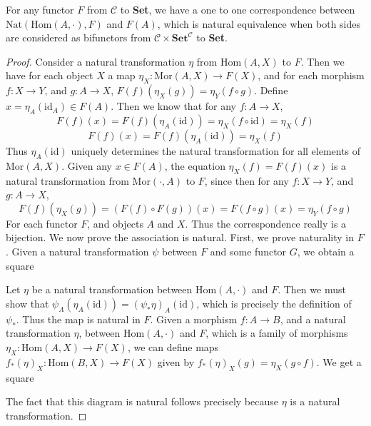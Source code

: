 \begin{theorem}[Yoneda]
    For any functor $F$ from $\mathcal{C}$ to {\bf Set}, we have a one to one correspondence between $\text{Nat}(\text{Hom}(A,\cdot),F)$ and $F(A)$, which is natural equivalence when both sides are considered as bifunctors from $\mathcal{C} \times \mathbf{Set}^{\mathcal{C}}$ to {\bf Set}.
\end{theorem}
\begin{proof}
    Consider a natural transformation $\eta$ from $\text{Hom}(A,X)$ to $F$. Then we have for each object $X$ a map $\eta_X: \text{Mor}(A,X) \to F(X)$, and for each morphism $f: X \to Y$, and $g: A \to X$, $F(f)(\eta_X(g)) = \eta_Y(f \circ g)$. Define $x = \eta_A(\text{id}_A) \in F(A)$. Then we know that for any $f: A \to X$,
    \[ F(f)(x) = F(f)(\eta_A(\text{id})) = \eta_X(f \circ \text{id}) = \eta_X(f) \]
    \[ F(f)(x) = F(f)(\eta_A(\text{id})) = \eta_X(f) \]
    Thus $\eta_A(\text{id})$ uniquely determines the natural transformation for all elements of $\text{Mor}(A,X)$. Given any $x \in F(A)$, the equation $\eta_X(f) = F(f)(x)$ is a natural transformation from $\text{Mor}(\cdot,A)$ to $F$, since then for any $f: X \to Y$, and $g: A \to X$,
    \[ F(f)(\eta_X(g)) = (F(f) \circ F(g))(x) = F(f \circ g)(x) = \eta_Y(f \circ g) \]
    For each functor $F$, and objects $A$ and $X$. Thus the correspondence really is a bijection. We now prove the association is natural. First, we prove naturality in $F$. Given a natural transformation $\psi$ between $F$ and some functor $G$, we obtain a square
    \begin{center}
    \end{center}
    Let $\eta$ be a natural transformation between $\text{Hom}(A,\cdot)$ and $F$. Then we must show that $\psi_A(\eta_A(\text{id})) = (\psi_* \eta)_A(\text{id})$, which is precisely the definition of $\psi_*$. Thus the map is natural in $F$. Given a morphism $f: A \to B$, and a natural transformation $\eta$, between $\text{Hom}(A,\cdot)$ and $F$, which is a family of morphisms $\eta_X: \text{Hom}(A,X) \to F(X)$, we can define maps $f_*(\eta)_X: \text{Hom}(B,X) \to F(X)$ given by $f_*(\eta)_X(g) = \eta_X(g \circ f)$. We get a square
    \begin{center}
    \end{center}
    The fact that this diagram is natural follows precisely because $\eta$ is a natural transformation.
\end{proof}

